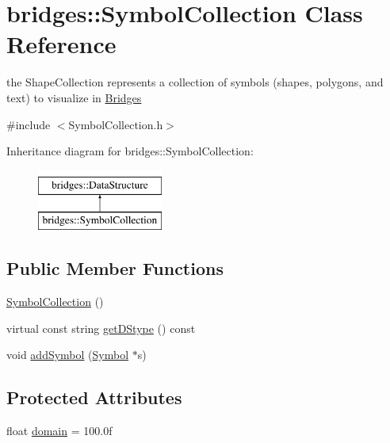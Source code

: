 \hypertarget{classbridges_1_1_symbol_collection}{}\section{bridges\+:\+:Symbol\+Collection Class Reference}
\label{classbridges_1_1_symbol_collection}


the Shape\+Collection represents a collection of symbols (shapes, polygons, and text) to visualize in \mbox{\hyperlink{classbridges_1_1_bridges}{Bridges}}  




{\ttfamily \#include $<$Symbol\+Collection.\+h$>$}

Inheritance diagram for bridges\+:\+:Symbol\+Collection\+:\begin{figure}[H]
\begin{center}
\leavevmode
\includegraphics[height=2.000000cm]{classbridges_1_1_symbol_collection}
\end{center}
\end{figure}
\subsection*{Public Member Functions}
\begin{DoxyCompactItemize}
\item 
\mbox{\hyperlink{classbridges_1_1_symbol_collection_ae3b3dd944594e1ebac451c0557a45f80}{Symbol\+Collection}} ()
\item 
virtual const string \mbox{\hyperlink{classbridges_1_1_symbol_collection_a9bc5abacaf6f90b2d013963311c8052e}{get\+D\+Stype}} () const
\item 
void \mbox{\hyperlink{classbridges_1_1_symbol_collection_acdc101f6651becc430e281ed967ddedf}{add\+Symbol}} (\mbox{\hyperlink{classbridges_1_1_symbol}{Symbol}} $\ast$s)
\end{DoxyCompactItemize}
\subsection*{Protected Attributes}
\begin{DoxyCompactItemize}
\item 
float \mbox{\hyperlink{classbridges_1_1_symbol_collection_a9387df86c54863524ab4779ff8458c7a}{domain}} = 100.\+0f
\end{DoxyCompactItemize}


